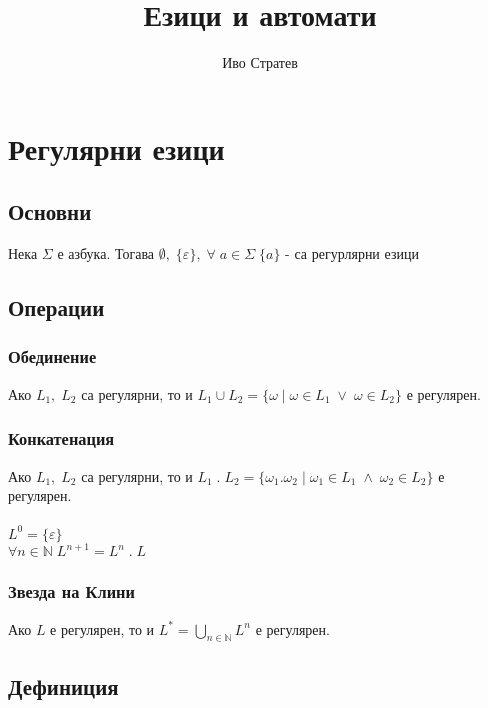 \documentclass[12pt]{article}
\title{Езици и автомати}
\author{Иво Стратев}
\newcommand{\N}{\mathbb{N}}
\begin{document}
\maketitle

\section*{Регулярни езици}

\subsection*{Основни}

Нека $\Sigma$ е азбука. Тогава $\emptyset, \; \{\varepsilon\}, \; \forall \; a \in \Sigma \; \{a\}$ - са регурлярни езици

\subsection*{Операции}

\subsubsection*{Обединение}

Ако $L_1, \; L_2$ са регулярни, то и $L_1 \cup L_2 = \{\omega \; | \; \omega \in L_1 \; \lor \; \omega \in L_2 \}$ е регулярен.

\subsubsection*{Конкатенация}

Ако $L_1, \; L_2$ са регулярни, то и $L_1 \; . \; L_2 = \{\omega_1.\omega_2 \; | \; \omega_1 \in L_1 \; \land \; \omega_2 \in L_2\}$ е регулярен. \\\\

$L^0 = \{\varepsilon\}$ \\

$\forall n \in \N \; L^{n + 1} = L^n\;.\;L $

\subsubsection*{Звезда на Клини}

Ако $L$ е регулярен, то и $L^* = \displaystyle\bigcup_{n \in \N} L^n$ е регулярен.

\subsection*{Дефиниция}
\end{document}
